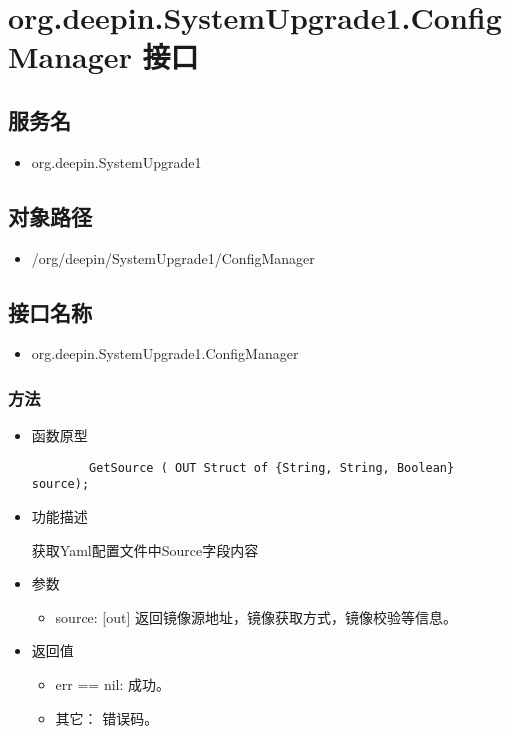 \documentclass{utart}
\begin{document}
\section{org.deepin.SystemUpgrade1.ConfigManager 接口}
\subsection{服务名}
\begin{itemize}
    \item org.deepin.SystemUpgrade1
\end{itemize}

\subsection{对象路径}
\begin{itemize}
    \item /org/deepin/SystemUpgrade1/ConfigManager
\end{itemize}

\subsection{接口名称}
\begin{itemize}
    \item org.deepin.SystemUpgrade1.ConfigManager
\end{itemize}

\subsubsection{方法}
\begin{itemize}
    \item 函数原型
    
    \begin{verbatim}
        GetSource ( OUT Struct of {String, String, Boolean} source);
      \end{verbatim}
    \item 功能描述
    
    获取Yaml配置文件中Source字段内容
    \item 参数
      \begin{itemize}
          \item source: [out] 返回镜像源地址，镜像获取方式，镜像校验等信息。
      \end{itemize}
    \item 返回值
      \begin{itemize}
          \item err == nil: 成功。
          \item 其它： 错误码。
      \end{itemize}
\end{itemize}
\end{document}

